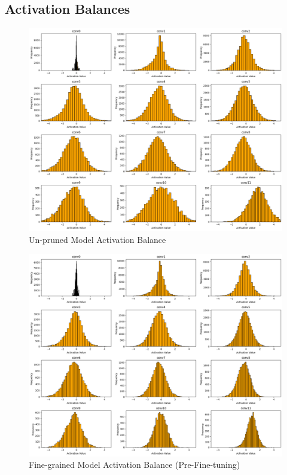 \documentclass[12pt]{article}
\begin{document}
\subsection{Activation Balances}
\label{activations}

\begin{figure}[h]
  \centering
  \includegraphics[width=1\linewidth]{report_images/unpruned_act.png}
  \caption{\label{fig:unpruned_act_dist}Un-pruned Model Activation Balance}
\end{figure}
\FloatBarrier

\begin{figure}[h]
  \centering
  \includegraphics[width=1\linewidth]{report_images/fine_act_pp.png}
  \caption{\label{fig:fine_act_dist_pp}Fine-grained Model Activation Balance (Pre-Fine-tuning)}
\end{figure}
\FloatBarrier
\end{document}
